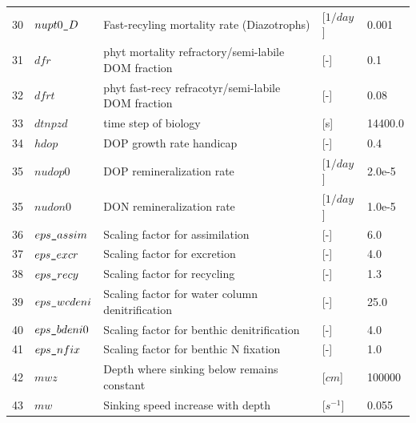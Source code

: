 \documentclass[a4paper]{article}
\begin{document}
\begin{itemize}
{\begin{longtable}{lllll}
   30  & $nupt0\verb|_|D$   & Fast-recyling mortality rate (Diazotrophs)                  & [$1/day$]                     & 0.001      \\
   31  & $dfr$              & phyt mortality refractory/semi-labile DOM fraction          & [-]                           & 0.1        \\
   32  & $dfrt$             & phyt fast-recy refracotyr/semi-labile DOM fraction          & [-]                           & 0.08       \\
   33  & $dtnpzd$           & time step of biology                                        & [s]                           & 14400.0    \\
   34  & $hdop$             & DOP growth rate handicap                                    & [-]                           & 0.4       \\
   35  & $nudop0$           & DOP remineralization rate                                   & [$1/day$]                     & 2.0e-5    \\
   35  & $nudon0$           & DON remineralization rate                                   & [$1/day$]                     & 1.0e-5    \\
   36  & $eps\verb|_|assim$ & Scaling factor for assimilation                             & [-]                           & 6.0       \\
   37  & $eps\verb|_|excr$  & Scaling factor for excretion                                & [-]                           & 4.0       \\
   38  & $eps\verb|_|recy$  & Scaling factor for recycling                                & [-]                           & 1.3       \\
   39  & $eps\verb|_|wcdeni$& Scaling factor for water column denitrification             & [-]                           & 25.0      \\
   40  & $eps\verb|_|bdeni0$& Scaling factor for benthic denitrification                  & [-]                           & 4.0      \\
   41  & $eps\verb|_|nfix$  & Scaling factor for benthic N fixation                       & [-]                           & 1.0      \\
   42  & $mwz$              & Depth where sinking below remains constant                  & [$cm$]                        & 100000    \\
   43  & $mw$               & Sinking speed increase with depth                           & [$s^{-1}$]                    & 0.055     \\ \hline
   \end{longtable}}


\end{itemize}
\end{document}
